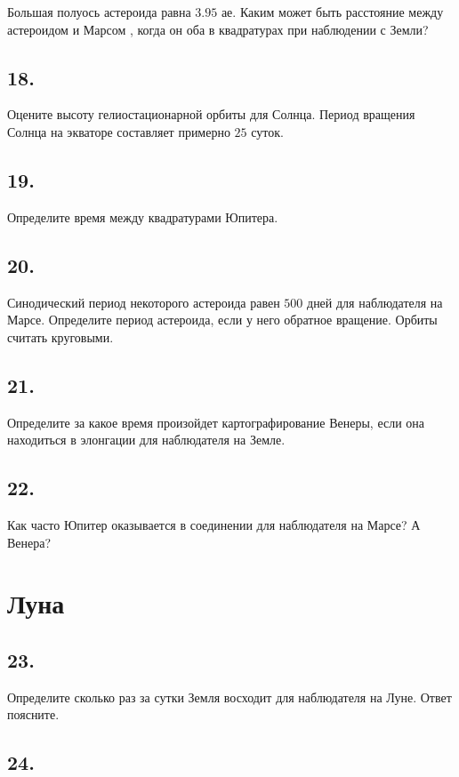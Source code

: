 \documentclass[a4paper,12pt]{article}
\begin{document}
Большая полуось астероида равна $3.95$ ае. Каким может быть расстояние между астероидом и Марсом , когда он оба в квадратурах при наблюдении с Земли?

\subsection*{18.}

Оцените высоту гелиостационарной орбиты для Солнца. Период вращения Солнца на экваторе составляет примерно $25$ суток.


\subsection*{19.}

Определите время между квадратурами Юпитера.

\subsection*{20.}

Синодический период некоторого астероида равен $500$ дней для наблюдателя на Марсе. Определите период астероида, если у него обратное вращение. Орбиты считать круговыми.


\subsection*{21. }

Определите за какое время произойдет картографирование Венеры, если она находиться в элонгации для наблюдателя на Земле.	

\subsection*{22.}

Как часто Юпитер оказывается в соединении для наблюдателя на Марсе? А Венера?

\section*{Луна}

\subsection*{23.}

Определите сколько раз за сутки Земля восходит для наблюдателя на Луне. Ответ поясните.

\subsection*{24.}
\end{document}
